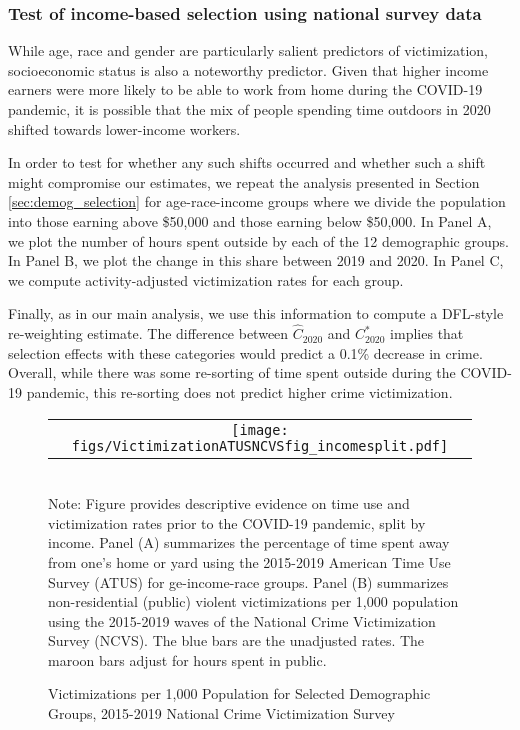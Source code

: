 \newpage 
\subsubsection{Test of income-based selection using national survey data}
While age, race and gender are particularly salient predictors of victimization, socioeconomic status is also a noteworthy predictor. Given that higher income earners were more likely to be able to work from home during the COVID-19 pandemic, it is possible that the mix of people spending time outdoors in 2020 shifted towards lower-income workers. 

In order to test for whether any such shifts occurred and whether such a shift might compromise our estimates, we repeat the analysis presented in Section \ref{sec:demog_selection} for age-race-income groups where we divide the population into those earning above \$50,000 and those earning below \$50,000. In Panel A, we plot the number of hours spent outside by each of the 12 demographic groups. In Panel B, we plot the change in this share between 2019 and 2020. In Panel C, we compute activity-adjusted victimization rates for each group. 

Finally, as in our main analysis, we use this information to compute a DFL-style re-weighting estimate. The difference between $\hat{C}_{2020}$ and $C_{2020}^{*}$ implies that selection effects with these categories would predict a 0.1\% decrease in crime. Overall, while there was some re-sorting of time spent outside during the COVID-19 pandemic, this re-sorting does not predict higher crime victimization.  

\begin{figure}
     \begin{center}
    \caption{Victimizations per 1,000 Population for Selected Demographic Groups, 2015-2019 National Crime Victimization Survey}
    \begin{tabular}{c}
    \hspace*{-3cm}
    \texttt{[image: figs/VictimizationATUSNCVSfig\_incomesplit.pdf]}
    \end{tabular}
    \label{fig:victimization_by_inc}
         \end{center}
        \vspace*{0mm}  \\ 
        \newline 
Note: Figure provides descriptive evidence on time use and victimization rates prior to the COVID-19 pandemic, split by income. Panel (A) summarizes the percentage of time spent away from one's home or yard using the 2015-2019 American Time Use Survey (ATUS) for ge-income-race groups.  Panel (B) summarizes non-residential (public) violent victimizations per 1,000 population using the 2015-2019 waves of the National Crime Victimization Survey (NCVS). The blue bars are the unadjusted rates. The maroon bars adjust for hours spent in public.
\end{figure}

